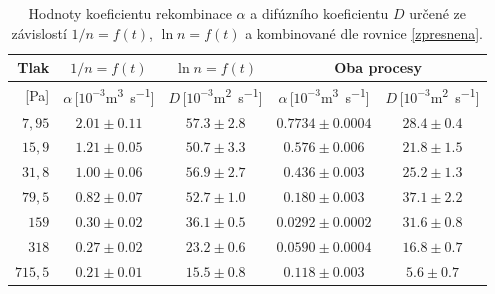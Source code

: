 \documentclass[a4paper,12pt]{article}
\begin{document}
\begin{table}[h]
	\centering
	\caption{Hodnoty koeficientu rekombinace $\alpha$ a difúzního koeficientu 
	$D$ určené ze závislostí $1/n = f(t)$, $\ln n = f(t)$ a kombinované dle 
	rovnice \eqref{zpresnena}.}
	\label{table:koef}
	\begin{tabular}{|r|c|c|c|c|}
		\hline
		Tlak    & $1/n = f(t)$      & $\ln n = f(t)$ & 
		\multicolumn{2}{c|}{Oba procesy}                                \\ 
		\hline
		{[}Pa{]} & 
		$\alpha$\,[$10^{-3}$\si{\meter\cubed\per\second}] & 
		$D$\,[$10^{-3}$\si{\metre^2\second^{-1}}]             & 
		$\alpha$\,[$10^{-3}$\si{\meter\cubed\per\second}] & 
		$D$\,[$10^{-3}$\si{\metre^2\second^{-1}}] \\ 
		\hline
		$7,95$                              &$ 2.01                 \pm 
		0.11                $&$ 57.3              \pm  2.8              $& 
		$0.7734    
		\pm 0.0004    $&$ 28.4       \pm  0.4       $\\ \hline
		$15,9$                             & $1.21                 \pm  
		0.05                $&$ 50.7              \pm  3.3              $&$ 
		0.576     
		\pm 0.006     $&$ 21.8       \pm  1.5       $\\ \hline
		$31,8                             $&$ 1.00                 \pm  
		0.06                $&$ 56.9              \pm  2.7              $&$ 
		0.436     
		\pm 0.003     $&$ 25.2       \pm  1.3       $\\ \hline
		$79,5                             $&$ 0.82                 \pm  
		0.07                $&$ 52.7              \pm  1.0              $&$ 
		0.180     
		\pm 0.003     $&$ 37.1       \pm  2.2       $\\ \hline
		$159                           $&$ 0.30                 \pm  
		0.02                $&$ 36.1              \pm  0.5              $& 
		$0.0292    
		\pm 0.0002    $&$ 31.6       \pm  0.8       $\\ \hline
		$318                           $&$ 0.27                 \pm  
		0.02                $&$ 23.2              \pm  0.6              $& 
		$0.0590    
		\pm 0.0004    $&$ 16.8       \pm  0.7       $\\ \hline
		$715,5                            $&$ 0.21                 \pm  
		0.01                $&$ 15.5              \pm  0.8              $& 
		$0.118     
		\pm 0.003     $&$ 5.6        \pm  0.7       $\\ \hline
	\end{tabular}
\end{table}
\clearpage
\end{document}
